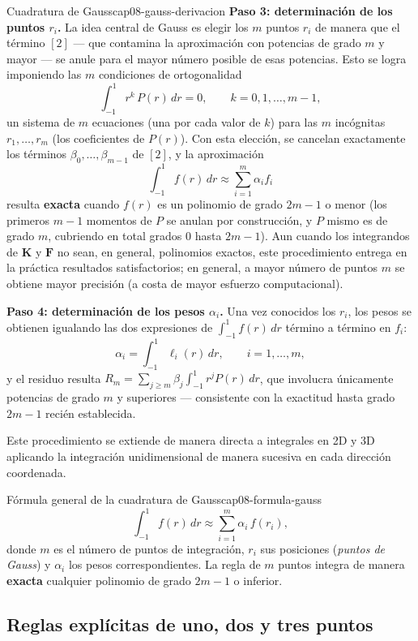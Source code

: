 \begin{teorema}{Cuadratura de Gauss}{cap08-gauss-derivacion}
\textbf{Paso 3: determinación de los puntos $r_i$.} La idea central de Gauss es elegir los $m$ puntos $r_i$ de manera que el término $[2]$ --- que contamina la aproximación con potencias de grado $m$ y mayor --- se anule para el mayor número posible de esas potencias. Esto se logra imponiendo las $m$ condiciones de ortogonalidad
\[
\int_{-1}^{1} r^k\,P(r)\,dr = 0, \qquad k=0,1,\dots,m-1 ,
\]
un sistema de $m$ ecuaciones (una por cada valor de $k$) para las $m$ incógnitas $r_1,\dots,r_m$ (los coeficientes de $P(r)$). Con esta elección, se cancelan exactamente los términos $\beta_0,\dots,\beta_{m-1}$ de $[2]$, y la aproximación
\[
\int_{-1}^1 f(r)\,dr \approx \sum_{i=1}^m \alpha_i f_i
\]
resulta \textbf{exacta} cuando $f(r)$ es un polinomio de grado $2m-1$ o menor (los primeros $m-1$ momentos de $P$ se anulan por construcción, y $P$ mismo es de grado $m$, cubriendo en total grados $0$ hasta $2m-1$). Aun cuando los integrandos de $\bm K$ y $\bm F$ no sean, en general, polinomios exactos, este procedimiento entrega en la práctica resultados satisfactorios; en general, a mayor número de puntos $m$ se obtiene mayor precisión (a costa de mayor esfuerzo computacional).

\textbf{Paso 4: determinación de los pesos $\alpha_i$.} Una vez conocidos los $r_i$, los pesos se obtienen igualando las dos expresiones de $\int_{-1}^1 f(r)\,dr$ término a término en $f_i$:
\[
\alpha_i = \int_{-1}^{1} \ell_i(r)\,dr, \qquad i=1,\dots,m ,
\]
y el residuo resulta $R_m = \sum_{j\geq m}\beta_j\int_{-1}^1 r^j P(r)\,dr$, que involucra únicamente potencias de grado $m$ y superiores --- consistente con la exactitud hasta grado $2m-1$ recién establecida.

Este procedimiento se extiende de manera directa a integrales en 2D y 3D aplicando la integración unidimensional de manera sucesiva en cada dirección coordenada.
\end{teorema}

\begin{ecnimportante}{Fórmula general de la cuadratura de Gauss}{cap08-formula-gauss}
\[
\int_{-1}^{1} f(r)\,dr \approx \sum_{i=1}^{m} \alpha_i\, f(r_i) ,
\]
donde $m$ es el número de puntos de integración, $r_i$ sus posiciones (\emph{puntos de Gauss}) y $\alpha_i$ los pesos correspondientes. La regla de $m$ puntos integra de manera \textbf{exacta} cualquier polinomio de grado $2m-1$ o inferior.
\end{ecnimportante}

\subsection{Reglas explícitas de uno, dos y tres puntos}

